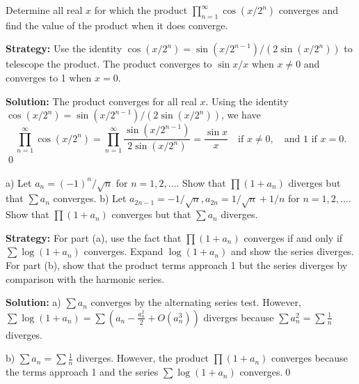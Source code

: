 \begin{problembox}
\begin{problemstatement}
Determine all real \(x\) for which the product \(\prod_{n=1}^{\infty} \cos (x/2^n)\) converges and find the value of the product when it does converge.
\end{problemstatement}
\end{problembox}

\noindent\textbf{Strategy:} Use the identity \(\cos(x/2^n) = \sin(x/2^{n-1})/(2\sin(x/2^n))\) to telescope the product. The product converges to \(\sin x/x\) when \(x \neq 0\) and converges to 1 when \(x = 0\).

\bigskip\noindent\textbf{Solution:}
The product converges for all real \(x\). Using the identity \(\cos(x/2^n) = \sin(x/2^{n-1})/(2\sin(x/2^n))\), we have
\[\prod_{n=1}^{\infty} \cos(x/2^n) = \prod_{n=1}^{\infty} \frac{\sin(x/2^{n-1})}{2\sin(x/2^n)} = \frac{\sin x}{x} \quad \text{if } x \neq 0, \quad \text{and } 1 \text{ if } x = 0.\] \qed



\begin{problembox}
\begin{problemstatement}
a) Let \(a_n = (-1)^n/\sqrt{n}\) for \(n = 1, 2, \ldots\). Show that \(\prod (1 + a_n)\) diverges but that \(\sum a_n\) converges.
b) Let \(a_{2n-1} = -1/\sqrt{n}, a_{2n} = 1/\sqrt{n} + 1/n\) for \(n = 1, 2, \ldots\). Show that \(\prod (1 + a_n)\) converges but that \(\sum a_n\) diverges.
\end{problemstatement}
\end{problembox}

\noindent\textbf{Strategy:} For part (a), use the fact that \(\prod(1+a_n)\) converges if and only if \(\sum \log(1+a_n)\) converges. Expand \(\log(1+a_n)\) and show the series diverges. For part (b), show that the product terms approach 1 but the series diverges by comparison with the harmonic series.

\bigskip\noindent\textbf{Solution:}
a) \(\sum a_n\) converges by the alternating series test. However, \(\sum \log(1+a_n) = \sum \left(a_n - \frac{a_n^2}{2} + O(a_n^3)\right)\) diverges because \(\sum a_n^2 = \sum \frac{1}{n}\) diverges.

b) \(\sum a_n = \sum \frac{1}{n}\) diverges. However, the product \(\prod(1+a_n)\) converges because the terms approach 1 and the series \(\sum \log(1+a_n)\) converges.\qed



